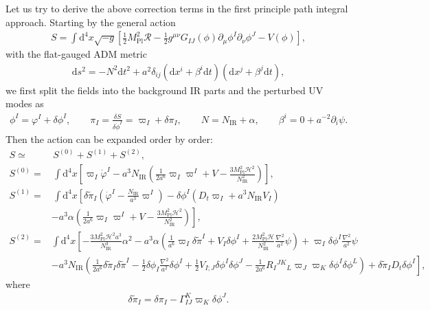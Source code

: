 \documentclass[aps, prd
, preprint
, nofootinbib 
, longbibliography
]{revtex4-1}
\newcommand{\dd}{\mathrm{d}}
\newcommand{\Mpl}{M_\mathrm{Pl}}
\newcommand{\IR}{\mathrm{IR}}
\newcommand{\calH}{\mathcal{H}}
\newcommand{\calR}{\mathcal{R}}
\newcommand{\bae}[1]{\begin{align} #1 \end{align}}
\begin{document}
Let us try to derive the above correction terms in the first principle path integral approach.
Starting by the general action
\bae{
    S=\int\dd^4x\sqrt{-g}\left[\frac{1}{2}\Mpl^2\calR-\frac{1}{2}g^{\mu\nu}G_{IJ}(\phi)\partial_\mu\phi^I\partial_\nu\phi^J-V(\phi)\right],
}
with the flat-gauged ADM metric
\bae{
    \dd s^2=-N^2\dd t^2+a^2\delta_{ij}(\dd x^i+\beta^i\dd t)(\dd x^j+\beta^j\dd t),
}
we first split the fields into the background IR parts and the perturbed UV modes as
\bae{
    \phi^I=\varphi^I+\delta\phi^I, \qquad \pi_I=\frac{\delta S}{\delta\dot{\phi}^I}=\varpi_I+\delta\pi_I, \qquad N=N_\IR+\alpha, \qquad \beta^i=0+a^{-2}\partial_i\psi.
}
Then the action can be expanded order by order:
\bae{
    S\simeq&\, S^{(0)}+S^{(1)}+S^{(2)}, \\
    S^{(0)}=&\,\int\dd^4x\left[\varpi_I\dot{\varphi}^I-a^3N_\IR\left(\frac{1}{2a^6}\varpi_I\varpi^I+V-\frac{3\Mpl^2\calH^2}{N_\IR^2}\right)\right], \\
    S^{(1)}=&\,\int\dd^4x\left[\delta\tilde{\pi}_I\left(\dot{\varphi}^I-\frac{N_\IR}{a^3}\varpi^I\right)-\delta\phi^I\left(D_t\varpi_I+a^3N_\IR V_I\right)\right. \nonumber \\
    &\left.-a^3\alpha\left(\frac{1}{2a^6}\varpi_I\varpi^I+V-\frac{3\Mpl^2\calH^2}{N_\IR^2}\right)\right], \\
    S^{(2)}=&\int\dd^4x\left[-\frac{3\Mpl^2\calH^2a^3}{N_\IR^3}\alpha^2-a^3\alpha\left(\frac{1}{a^6}\varpi_I\delta\tilde{\pi}^I+V_I\delta\phi^I+\frac{2\Mpl^2\calH}{N_\IR^2}\frac{\nabla^2}{a^2}\psi\right)+\varpi_I\delta\phi^I\frac{\nabla^2}{a^2}\psi\right. \nonumber \\
    &\left.-a^3N_\IR\left(\frac{1}{2a^6}\delta\tilde{\pi}_I\delta\tilde{\pi}^I-\frac{1}{2}\delta\phi_I\frac{\nabla^2}{a^2}\delta\phi^I+\frac{1}{2}V_{I;J}\delta\phi^I\delta\phi^J-\frac{1}{2a^6}R_I{}^{JK}{}_L\varpi_J\varpi_K\delta\phi^I\delta\phi^L\right)+\delta\tilde{\pi}_ID_t\delta\phi^I\right],
}
where
\bae{
    \delta\tilde{\pi}_I=\delta\pi_I-\Gamma^K_{IJ}\varpi_K\delta\phi^J.
}
\end{document}
